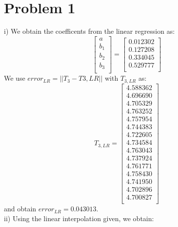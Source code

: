 \documentclass{article}
\begin{document}
\section*{Problem 1}

i) We obtain the coefficents from the linear regression as:
\begin{equation*}
\begin{bmatrix}{}
 a \\
 b_{1} \\
 b_{2} \\
 b_{3} \\
  \end{bmatrix} =
\begin{bmatrix}{}
  0.012302 \\ 
  0.127208 \\ 
  0.334045 \\ 
  0.529777 \\ 
  \end{bmatrix}
\end{equation*}
We use $error_{LR} = ||T_{3} - T{3,LR}||$ with $T_{3,LR}$ as:
\begin{equation*}
T_{3,LR} = \begin{bmatrix}{}
  4.588362 \\ 
  4.696690 \\ 
  4.705329 \\ 
  4.763252 \\ 
  4.757954 \\ 
  4.744383 \\ 
  4.722605 \\ 
  4.734584 \\ 
  4.763043 \\ 
  4.737924 \\ 
  4.761771 \\ 
  4.758430 \\ 
  4.741950 \\ 
  4.702896 \\ 
  4.700827 \\ 
  \end{bmatrix}
\end{equation*}
and obtain $error_{LR} = 0.043013$.
\vspace{5mm} \\
ii) Using the linear interpolation given, we obtain:
\end{document}
